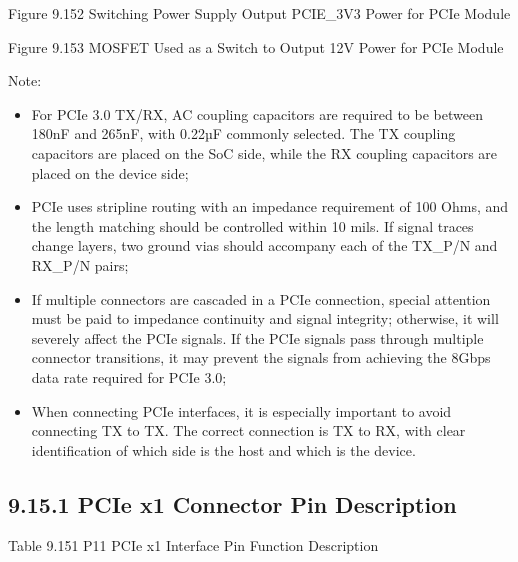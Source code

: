 \documentclass[letterpaper,10pt,openany,english]{sphinxmanual}
\begin{document}
\sphinxAtStartPar
{}

\sphinxAtStartPar
Figure 9.15\sphinxhyphen{}2 Switching Power Supply Output PCIE\_3V3 Power for PCIe Module

\sphinxAtStartPar
{}

\sphinxAtStartPar
Figure 9.15\sphinxhyphen{}3 MOSFET Used as a Switch to Output 12V Power for PCIe Module

\sphinxAtStartPar
Note:
\begin{itemize}
\item {} 
\sphinxAtStartPar
For PCIe 3.0 TX/RX, AC coupling capacitors are required to be between 180nF and 265nF, with 0.22µF commonly selected. The TX coupling capacitors are placed on the SoC side, while the RX coupling capacitors are placed on the device side;

\item {} 
\sphinxAtStartPar
PCIe uses stripline routing with an impedance requirement of 100 Ohms, and the length matching should be controlled within 10 mils. If signal traces change layers, two ground vias should accompany each of the TX\_P/N and RX\_P/N pairs;

\item {} 
\sphinxAtStartPar
If multiple connectors are cascaded in a PCIe connection, special attention must be paid to impedance continuity and signal integrity; otherwise, it will severely affect the PCIe signals. If the PCIe signals pass through multiple connector transitions, it may prevent the signals from achieving the 8Gbps data rate required for PCIe 3.0;

\item {} 
\sphinxAtStartPar
When connecting PCIe interfaces, it is especially important to avoid connecting TX to TX. The correct connection is TX to RX, with clear identification of which side is the host and which is the device.

\end{itemize}


\subsection{9.15.1 PCIe x1 Connector Pin Description}
\label{\detokenize{hardware:pcie-x1-connector-pin-description}}
\sphinxAtStartPar
Table 9.15\sphinxhyphen{}1 P11 PCIe x1 Interface Pin Function Description
\end{document}

